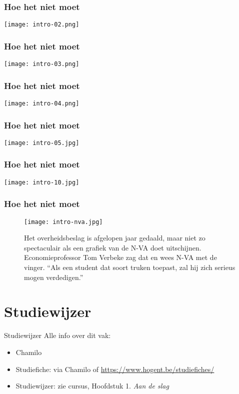 \documentclass[aspectratio=169]{beamer}
\begin{document}
\begin{frame}
  \frametitle{Hoe het niet moet}
  
  \centering
  \texttt{[image: intro-02.png]}
\end{frame}

\begin{frame}
  \frametitle{Hoe het niet moet}
  
  \centering
  \texttt{[image: intro-03.png]}
\end{frame}

\begin{frame}
  \frametitle{Hoe het niet moet}
  
  \centering
  \texttt{[image: intro-04.png]}
\end{frame}

\begin{frame}
  \frametitle{Hoe het niet moet}
  
  \centering
  \texttt{[image: intro-05.jpg]}
\end{frame}

\begin{frame}
  \frametitle{Hoe het niet moet}
  
  \centering
  \texttt{[image: intro-10.jpg]}
\end{frame}

\begin{frame}
  \frametitle{Hoe het niet moet}
  
  \begin{figure}
    \texttt{[image: intro-nva.jpg]}
    \caption{Het overheidsbeslag is afgelopen jaar gedaald, maar niet zo spectaculair als een grafiek van de N-VA doet uitschijnen. Economieprofessor Tom Verbeke zag dat en wees N-VA met de vinger. ``Als een student dat soort truken toepast, zal hij zich serieus mogen verdedigen.''}
  \end{figure}
  
\end{frame}

\section{Studiewijzer}

\begin{frame}{Studiewijzer}
  Alle info over dit vak:
  
  \begin{itemize}
    \item Chamilo
    \item Studiefiche: via Chamilo of \url{https://www.hogent.be/studiefiches/}
    \item Studiewijzer: zie cursus, Hoofdstuk 1. \textit{Aan de slag}
  \end{itemize}
\end{frame}
\end{document}
